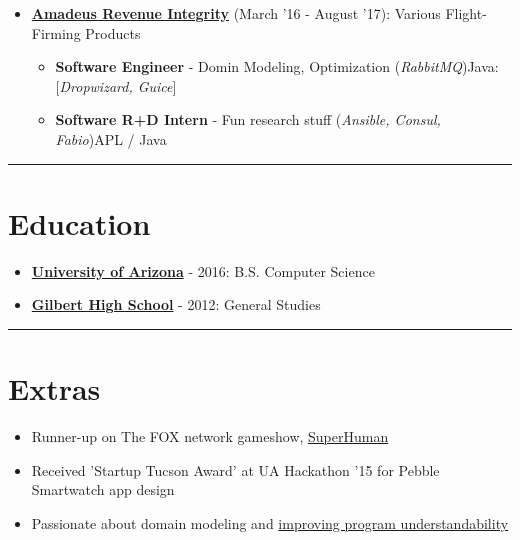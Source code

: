 \documentclass{article}
\begin{document}
\begin{itemize}
\begin{itemize}
\end{itemize}
\item \href{https://amadeus.com/en/portfolio/airlines/revenue-integrity}{\textbf{Amadeus Revenue Integrity}} {(March '16 - August '17)}: Various Flight-Firming Products 
\begin{itemize}
\item \textbf{Software Engineer} - Domin Modeling, Optimization (\textit{RabbitMQ})\newline Java: [\textit{Dropwizard, Guice}]
\item \textbf{Software R+D Intern} - Fun research stuff (\textit{Ansible, Consul, Fabio})\newline APL / Java
\end{itemize}
\end{itemize}
\noindent\rule{\linewidth}{1pt}

\raggedright{\section*{Education}}

\begin{itemize}
\item \href{https://www.cs.arizona.edu/}{\textbf{University of Arizona}} - 2016: B.S. Computer Science
\item \href{https://www.gilbertschools.net/gilberthigh}{\textbf{Gilbert High School}} - 2012: General Studies
\end{itemize}
\noindent\rule{\linewidth}{1pt}

\raggedright{\section*{Extras}}

\begin{itemize}
\item Runner-up on The FOX network gameshow, \href{https://www.youtube.com/watch?v=t65mzlOCDF8}{SuperHuman}
\item Received 'Startup Tucson Award' at UA Hackathon '15 for Pebble Smartwatch app design
\item Passionate about domain modeling and \href{https://www.kaden.dev/pages/musings/software_doesnt_have_clay.html}{improving program understandability}
\end{itemize}
\vspace*{\fill}

\end{document}
